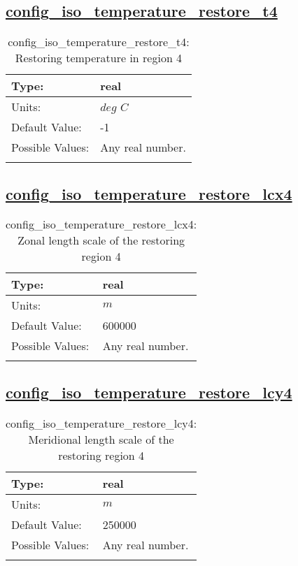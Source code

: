 \subsection[config\_iso\_temperature\_restore\_t4]{\hyperref[sec:nm_tab_iso]{config\_iso\_temperature\_restore\_t4}}
\label{subsec:nm_sec_config_iso_temperature_restore_t4}
\begin{center}
\begin{longtable}{| p{2.0in} || p{4.0in} |}
    \hline
    Type: & real \\
    \hline
    Units: & $deg$ $C$ \\
    \hline
    Default Value: & -1 \\
    \hline
    Possible Values: & Any real number. \\
    \hline
    \caption{config\_iso\_temperature\_restore\_t4: Restoring temperature in region 4}
\end{longtable}
\end{center}
\subsection[config\_iso\_temperature\_restore\_lcx4]{\hyperref[sec:nm_tab_iso]{config\_iso\_temperature\_restore\_lcx4}}
\label{subsec:nm_sec_config_iso_temperature_restore_lcx4}
\begin{center}
\begin{longtable}{| p{2.0in} || p{4.0in} |}
    \hline
    Type: & real \\
    \hline
    Units: & $m$ \\
    \hline
    Default Value: & 600000 \\
    \hline
    Possible Values: & Any real number. \\
    \hline
    \caption{config\_iso\_temperature\_restore\_lcx4: Zonal length scale of the restoring region 4}
\end{longtable}
\end{center}
\subsection[config\_iso\_temperature\_restore\_lcy4]{\hyperref[sec:nm_tab_iso]{config\_iso\_temperature\_restore\_lcy4}}
\label{subsec:nm_sec_config_iso_temperature_restore_lcy4}
\begin{center}
\begin{longtable}{| p{2.0in} || p{4.0in} |}
    \hline
    Type: & real \\
    \hline
    Units: & $m$ \\
    \hline
    Default Value: & 250000 \\
    \hline
    Possible Values: & Any real number. \\
    \hline
    \caption{config\_iso\_temperature\_restore\_lcy4: Meridional length scale of the restoring region 4}
\end{longtable}
\end{center}
